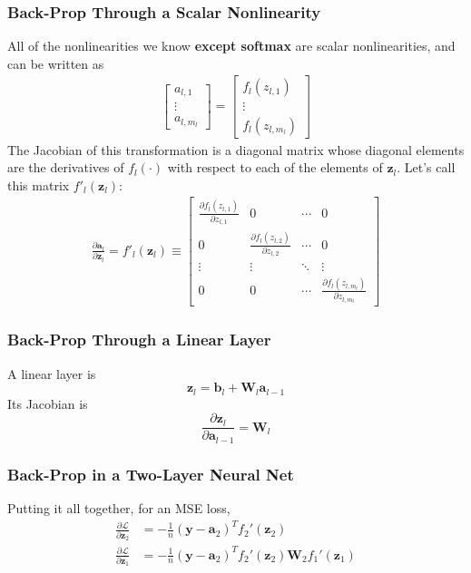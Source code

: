 \documentclass{beamer}
\begin{document}
\begin{frame}
  \frametitle{Back-Prop Through a Scalar Nonlinearity}

  All of the nonlinearities we know {\bf except softmax} are scalar nonlinearities, and can be written as
  \begin{align*}
    \left[\begin{array}{c}
        a_{l,1}\\
        \vdots\\
        a_{l,m_l}
      \end{array}\right]=
    \left[\begin{array}{c}
        f_l(z_{l,1})\\
        \vdots\\
        f_l(z_{l,m_l})
      \end{array}\right]
  \end{align*}
  The Jacobian of this transformation is a diagonal matrix whose
  diagonal elements are the derivatives of $f_l(\cdot)$ with respect
  to each of the elements of $\mathbf{z}_l$.  Let's call this matrix
  $f'_l(\mathbf{z}_l)$:
  \begin{align*}
    \frac{\partial\mathbf{a}_l}{\partial\mathbf{z}_l} 
    =f'_l(\mathbf{z}_l)\equiv
    \left[\begin{array}{cccc}
        \frac{\partial f_l(z_{l,1})}{\partial z_{l,1}}&0&\cdots&0\\
        0&\frac{\partial f_l(z_{l,2})}{\partial z_{l,2}}&\cdots&0\\
        \vdots&\vdots&\ddots&\vdots\\
        0&0&\cdots&\frac{\partial f_l(z_{l,m_l})}{\partial z_{l,m_l}}
      \end{array}\right]
  \end{align*}
\end{frame}

\begin{frame}
  \frametitle{Back-Prop Through a Linear Layer}
  A linear layer is
  \begin{displaymath}
    \mathbf{z}_l=\mathbf{b}_l+\mathbf{W}_l\mathbf{a}_{l-1}
  \end{displaymath}
  Its Jacobian is
  \begin{displaymath}
    \frac{\partial\mathbf{z}_l}{\partial\mathbf{a}_{l-1}}=\mathbf{W}_l
  \end{displaymath}
\end{frame}

\begin{frame}
  \frametitle{Back-Prop in a Two-Layer Neural Net}
  Putting it all together, for an MSE loss,
  \begin{align*}
    \frac{\partial\mathcal{L}}{\partial\mathbf{z}_2}&=
    -\frac{1}{n}(\mathbf{y}-\mathbf{a}_2)^Tf_2'(\mathbf{z}_2)\\
    \frac{\partial\mathcal{L}}{\partial\mathbf{z}_1}&=
    -\frac{1}{n}(\mathbf{y}-\mathbf{a}_2)^Tf_2'(\mathbf{z}_2)\mathbf{W}_2f_1'(\mathbf{z}_1)
  \end{align*}
\end{frame}
\end{document}
